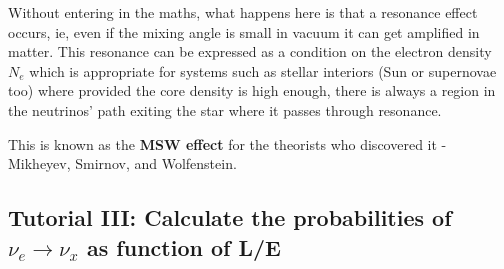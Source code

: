 \documentclass[
  letterpaper,
  DIV=11,
  numbers=noendperiod]{scrreprt}
\begin{document}
Without entering in the maths, what happens here is that a resonance
effect occurs, ie, even if the mixing angle is small in vacuum it can
get amplified in matter. This resonance can be expressed as a condition
on the electron density \(N_e\) which is appropriate for systems such as
stellar interiors (Sun or supernovae too) where provided the core
density is high enough, there is always a region in the neutrinos' path
exiting the star where it passes through resonance.

This is known as the \textbf{MSW effect} for the theorists who
discovered it - Mikheyev, Smirnov, and Wolfenstein.

\subsection*{\texorpdfstring{Tutorial III: Calculate the probabilities
of \(\nu_e \rightarrow \nu_x\) as function of
L/E}{Tutorial III: Calculate the probabilities of \textbackslash nu\_e \textbackslash rightarrow \textbackslash nu\_x as function of L/E}}\label{tutorial-iii-calculate-the-probabilities-of-nu_e-rightarrow-nu_x-as-function-of-le}
\end{document}
